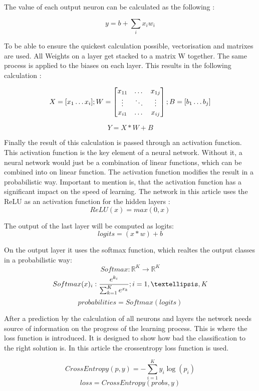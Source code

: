 The value of each output neuron can be calculated as the following \cite{medium_nn_from_scratch}:

$$y = b + \sum_{i} x_i w_i$$

To be able to ensure the quickest calculation possible, vectorisation and matrixes are used.
All Weights on a layer get stacked to a matrix W together.
The same process is applied to the biases on each layer.
This results in the following calculation
\cite{medium_nn_from_scratch}:

$$ X = [ x_1 \dots x_i ]; \space W = 
\begin{bmatrix}
    x_{11} & \dots  & x_{1j} \\
    \vdots & \ddots & \vdots \\
    x_{i1} & \dots  & x_{ij}
\end{bmatrix}; \space
B = [ b_1 \dots b_j ] $$

\begin{equation}
    Y = X * W + B
\end{equation}

Finally the result of this calculation is passed through an activation function.
This activation function is the key element of a neural network.
Without it, a neural network would just be a combination of linear functions, which can be combined into on linear function.
The activation function modifies the result in a probabilistic way.
Important to mention is, that the activation function has a significant impact on the speed of learning.
The network in this article uses the ReLU as an activation function for the hidden layers \cite{math_nn_skalski,relu}:
$$ReLU(x) = max(0,x)$$

The output of the last layer will be computed as logits:
$$logits = (x*w)+b$$

On the output layer it uses the softmax function, which realtes the output classes in a probabilistic way:
$$ Softmax : \mathbb{R}^K \to \mathbb{R}^K $$
$$ Softmax(x)_i : \frac{e^{k_i}}{\sum_{k=1}^K e^{x_k}}
\space ; i = 1, …, K
$$
$$probabilities = Softmax(logits)$$

After a prediction by the calculation of all neurons and layers the network needs source of information on the progress of the learning process.
This is where the loss function is introduced.
It is designed to show how bad the classification to the right solution is.
In this article the crossentropy loss function is used.
\cite{math_nn_skalski, medium_nn_from_scratch}

$$CrossEntropy(p,y) = -\sum_{i=1}^K y_i \log(p_i)$$
$$loss = CrossEntropy(probs, y)$$

